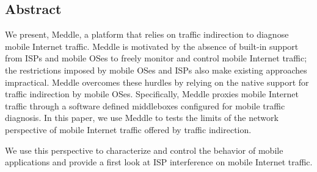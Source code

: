 \subsection*{Abstract}

We present, Meddle, a platform that relies on traffic indirection to diagnose mobile Internet traffic.
Meddle is motivated by the absence of built-in support from ISPs and mobile OSes to freely monitor and control mobile Internet traffic; the restrictions imposed by mobile OSes and ISPs also make existing approaches impractical.
Meddle overcomes these hurdles by relying on the native support for traffic indirection by mobile OSes.
Specifically, Meddle proxies mobile Internet traffic through a software defined middleboxes configured for mobile traffic diagnosis. 
In this paper, we use Meddle to tests the limits of the network perspective of mobile Internet traffic offered by traffic indirection. 

We use this perspective to characterize and control the behavior of mobile applications and provide a first look at ISP interference on mobile Internet traffic. 








